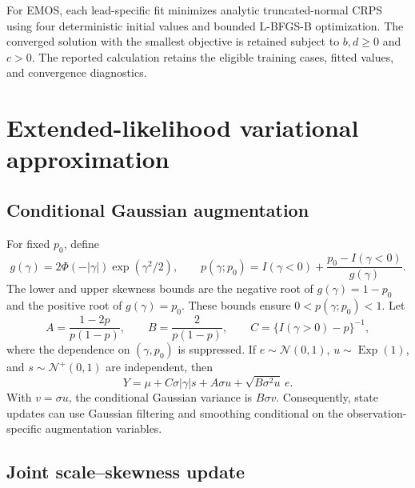 For EMOS, each lead-specific fit minimizes analytic truncated-normal CRPS
using four deterministic initial values and bounded L-BFGS-B optimization.
The converged solution with the smallest objective is retained subject to
$b,d\ge0$ and $c>0$. The reported calculation retains the eligible training
cases, fitted values, and convergence diagnostics.

\section{Extended-likelihood variational approximation}


\subsection{Conditional Gaussian augmentation}
\label{env:app:augmentation}

For fixed $p_0$, define
\[
g(\gamma)=2\Phi(-|\gamma|)\exp(\gamma^2/2),
\qquad
p(\gamma;p_0)=I(\gamma<0)+
\frac{p_0-I(\gamma<0)}{g(\gamma)}.
\]
The lower and upper skewness bounds are the negative root of
$g(\gamma)=1-p_0$ and the positive root of $g(\gamma)=p_0$. These bounds
ensure $0<p(\gamma;p_0)<1$. Let
\[
A=\frac{1-2p}{p(1-p)},\qquad
B=\frac{2}{p(1-p)},\qquad
C=\{I(\gamma>0)-p\}^{-1},
\]
where the dependence on $(\gamma,p_0)$ is suppressed. If
$e\sim\mathcal N(0,1)$, $u\sim\operatorname{Exp}(1)$, and
$s\sim\mathcal N^+(0,1)$ are independent, then
\[
Y=\mu+C\sigma|\gamma|s+A\sigma u+
\sqrt{B\sigma^2u}\,e.
\]
With $v=\sigma u$, the conditional Gaussian variance is $B\sigma v$.
Consequently, state updates can use Gaussian filtering and smoothing
conditional on the observation-specific augmentation variables.

\subsection{Joint scale--skewness update}
\label{env:app:vblad}

